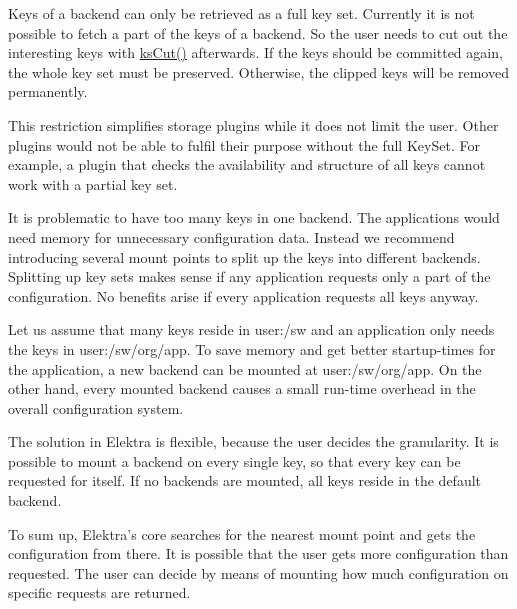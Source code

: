 Keys of a backend can only be retrieved as a full key set. Currently it is not possible to fetch a part of the keys of a backend. So the user needs to cut out the interesting keys with {\ttfamily \hyperlink{group__keyset_ga6b00cf82b59af4d883a9bad6cf4a4a4a}{ks\+Cut()}} afterwards. If the keys should be committed again, the whole key set must be preserved. Otherwise, the clipped keys will be removed permanently.

This restriction simplifies storage plugins while it does not limit the user. Other plugins would not be able to fulfil their purpose without the full {\ttfamily Key\+Set}. For example, a plugin that checks the availability and structure of all keys cannot work with a partial key set.

It is problematic to have too many keys in one backend. The applications would need memory for unnecessary configuration data. Instead we recommend introducing several mount points to split up the keys into different backends. Splitting up key sets makes sense if any application requests only a part of the configuration. No benefits arise if every application requests all keys anyway.

Let us assume that many keys reside in {\ttfamily user\+:/sw} and an application only needs the keys in {\ttfamily user\+:/sw/org/app}. To save memory and get better startup-\/times for the application, a new backend can be mounted at {\ttfamily user\+:/sw/org/app}. On the other hand, every mounted backend causes a small run-\/time overhead in the overall configuration system.

The solution in Elektra is flexible, because the user decides the granularity. It is possible to mount a backend on every single key, so that every key can be requested for itself. If no backends are mounted, all keys reside in the default backend.

To sum up, Elektra’s core searches for the nearest mount point and gets the configuration from there. It is possible that the user gets more configuration than requested. The user can decide by means of mounting how much configuration on specific requests are returned. 